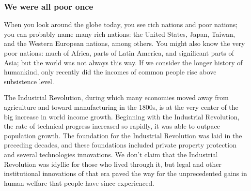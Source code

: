 \documentclass[11pt]{article} %
\begin{document}
\subsubsection*{We were all poor once}
When you look around the globe today, you see rich nations and poor nations; you can probably name many rich nations: the United States, Japan, Taiwan, and the Western European nations, among others. You might also know the very poor nations: much of Africa, parts of Latin America, and significant parts of Asia; but the world was not always this way. If we consider the longer history of humankind, only recently did the incomes of common people rise above subsistence level.

The Industrial Revolution, during which many economies moved away from agriculture and toward manufacturing in the 1800s, is at the very center of the big increase in world income growth. Beginning with the Industrial Revolution, the rate of technical progress increased so rapidly, it was able to outpace population growth. The foundation for the Industrial Revolution was laid in the preceding decades, and these foundations included private property protection and several technologies innovations. We don't claim that the Industrial Revolution was idyllic for those who lived through it, but legal and other institutional innovations of that era paved the way for the unprecedented gains in human welfare that people have since experienced.
\end{document}
